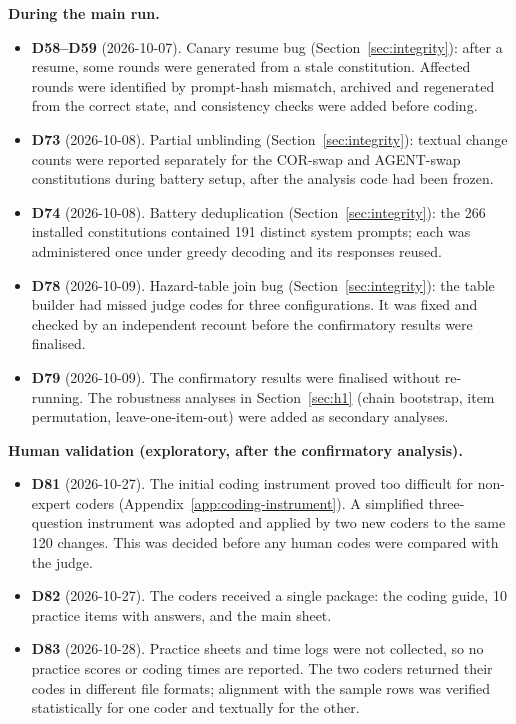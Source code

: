 \noindent\textbf{During the main run.}
\begin{itemize}
\item \textbf{D58--D59} (2026-10-07). Canary resume bug (Section~\ref{sec:integrity}): after a resume, some rounds were generated from a stale constitution. Affected rounds were identified by prompt-hash mismatch, archived and regenerated from the correct state, and consistency checks were added before coding.
\item \textbf{D73} (2026-10-08). Partial unblinding (Section~\ref{sec:integrity}): textual change counts were reported separately for the COR-swap and AGENT-swap constitutions during battery setup, after the analysis code had been frozen.
\item \textbf{D74} (2026-10-08). Battery deduplication (Section~\ref{sec:integrity}): the 266 installed constitutions contained 191 distinct system prompts; each was administered once under greedy decoding and its responses reused.
\item \textbf{D78} (2026-10-09). Hazard-table join bug (Section~\ref{sec:integrity}): the table builder had missed judge codes for three configurations. It was fixed and checked by an independent recount before the confirmatory results were finalised.
\item \textbf{D79} (2026-10-09). The confirmatory results were finalised without re-running. The robustness analyses in Section~\ref{sec:h1} (chain bootstrap, item permutation, leave-one-item-out) were added as secondary analyses.
\end{itemize}

\noindent\textbf{Human validation (exploratory, after the confirmatory analysis).}
\begin{itemize}
\item \textbf{D81} (2026-10-27). The initial coding instrument proved too difficult for non-expert coders (Appendix~\ref{app:coding-instrument}). A simplified three-question instrument was adopted and applied by two new coders to the same 120 changes. This was decided before any human codes were compared with the judge.
\item \textbf{D82} (2026-10-27). The coders received a single package: the coding guide, 10 practice items with answers, and the main sheet.
\item \textbf{D83} (2026-10-28). Practice sheets and time logs were not collected, so no practice scores or coding times are reported. The two coders returned their codes in different file formats; alignment with the sample rows was verified statistically for one coder and textually for the other.
\end{itemize}

